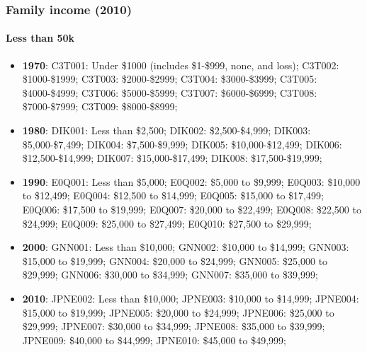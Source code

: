 \documentclass[a4paper]{article}
\begin{document}
\subsubsection{Family income (2010)}
\paragraph{Less than 50k}
\begin{itemize}
   \item{\textbf{1970}:  C3T001: Under \$1000 (includes \$1-\$999, none, and loss); C3T002: \$1000-\$1999; C3T003: \$2000-\$2999; C3T004: \$3000-\$3999; C3T005: \$4000-\$4999; C3T006: \$5000-\$5999; C3T007: \$6000-\$6999; C3T008: \$7000-\$7999; C3T009: \$8000-\$8999;}
   \item{\textbf{1980}:  DIK001: Less than \$2,500; DIK002: \$2,500-\$4,999; DIK003: \$5,000-\$7,499; DIK004: \$7,500-\$9,999; DIK005: \$10,000-\$12,499; DIK006: \$12,500-\$14,999; DIK007: \$15,000-\$17,499; DIK008: \$17,500-\$19,999;}
   \item{\textbf{1990}:  E0Q001: Less than \$5,000; E0Q002: \$5,000 to \$9,999; E0Q003: \$10,000 to \$12,499; E0Q004: \$12,500 to \$14,999; E0Q005: \$15,000 to \$17,499; E0Q006: \$17,500 to \$19,999; E0Q007: \$20,000 to \$22,499; E0Q008: \$22,500 to \$24,999; E0Q009: \$25,000 to \$27,499; E0Q010: \$27,500 to \$29,999;}
   \item{\textbf{2000}:  GNN001: Less than \$10,000; GNN002: \$10,000 to \$14,999; GNN003: \$15,000 to \$19,999; GNN004: \$20,000 to \$24,999; GNN005: \$25,000 to \$29,999; GNN006: \$30,000 to \$34,999; GNN007: \$35,000 to \$39,999;}
   \item{\textbf{2010}:  JPNE002: Less than \$10,000; JPNE003: \$10,000 to \$14,999; JPNE004: \$15,000 to \$19,999; JPNE005: \$20,000 to \$24,999; JPNE006: \$25,000 to \$29,999; JPNE007: \$30,000 to \$34,999; JPNE008: \$35,000 to \$39,999; JPNE009: \$40,000 to \$44,999; JPNE010: \$45,000 to \$49,999;}
\end{itemize}
\end{document}
